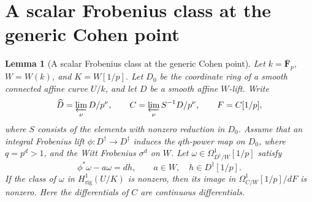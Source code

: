 \documentclass[11pt,a4paper]{article}
\newtheorem{lemma}[theorem]{Lemma}
\theoremstyle{remark}
\begin{document}
\section{A scalar Frobenius class at the generic Cohen point}
\begin{lemma}[A scalar Frobenius class at the generic Cohen point]
\label{lem:scalarFrobeniusCohen}
Let $k=\overline{\mathbf F}_p$, $W=W(k)$, and $K=W[1/p]$.
Let $D_0$ be the coordinate ring of a smooth connected affine curve
$U/k$, and let $D$ be a smooth affine $W$-lift. Write
\[
 \widehat D=\varprojlim_\nu D/p^\nu,
 \qquad C=\varprojlim_\nu S^{-1}D/p^\nu,
 \qquad F=C[1/p],
\]
where $S$ consists of the elements with nonzero reduction in $D_0$.
Assume that an integral Frobenius lift
$\phi:D^\dagger\to D^\dagger$ induces the $q$th-power map on $D_0$,
where $q=p^d>1$, and the Witt Frobenius $\sigma^d$ on $W$.
Let $\omega\in\Omega^1_{D^\dagger/W}[1/p]$ satisfy
\[
 \phi^*\omega-a\omega=dh,
 \qquad a\in W,\quad h\in D^\dagger[1/p].
\]
If the class of $\omega$ in $H^1_{\mathrm{rig}}(U/K)$ is nonzero,
then its image in $\Omega^1_{C/W}[1/p]/dF$ is nonzero.
Here the differentials of $C$ are continuous differentials.
\end{lemma}
\end{document}
